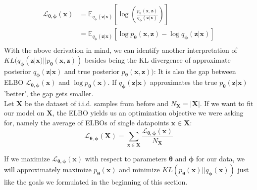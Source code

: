\documentclass[12pt]{report}
\begin{document}
\begin{equation}
\begin{split}
	\mathcal{L}_{\mathbf{\theta}, \mathbf{\phi}}(\mathbf{x}) 
	& = \mathbb{E}_{q_{\mathbf{\phi}}(\mathbf{z}|\mathbf{x})}\left[ \log\left(\frac{p_{\mathbf{\theta}}(\mathbf{x}, \mathbf{z})}{q_{\mathbf{\phi}}(\mathbf{z}|\mathbf{x})}\right) \right] \\
	& = \mathbb{E}_{q_{\mathbf{\phi}}(\mathbf{z}|\mathbf{x})}\left[ \log p_{\mathbf{\theta}}(\mathbf{x}, \mathbf{z}) - \log q_{\mathbf{\phi}}(\mathbf{z}|\mathbf{x}) \right]	\\
\end{split}
\end{equation}
With the above derivation in mind, we can identify another interpretation of $KL(q_{\mathbf{\phi}}(\mathbf{z}|\mathbf{x}) || p_{\mathbf{\theta}}(\mathbf{x}, \mathbf{z}))$ besides being the KL divergence of approximate posterior $q_{\mathbf{\phi}}(\mathbf{z}|\mathbf{x})$ and true posterior $p_{\mathbf{\theta}}(\mathbf{x}, \mathbf{z}))$: It is also the gap between ELBO $\mathcal{L}_{\mathbf{\theta}, \mathbf{\phi}}(\mathbf{x})$ and $\log p_{\mathbf{\theta}}(\mathbf{x})$. If $q_{\mathbf{\phi}}(\mathbf{z}|\mathbf{x})$ approximates the true $p_{\mathbf{\theta}}(\mathbf{z}|\mathbf{x})$ 'better', the gap gets smaller. \\
Let $\mathbf{X}$ be the dataset of i.i.d. samples from before and $N_{\mathbf{X}} = |\mathbf{X}|$. If we want to fit our model on $\mathbf{X}$, the ELBO yields us an optimization objective we were asking for, namely the average of ELBOs of single datapoints $\mathbf{x} \in \mathbf{X}$:
\begin{equation}
	\mathcal{L}_{\mathbf{\theta}, \mathbf{\phi}}(\mathbf{X}) = \sum_{\mathbf{x} \in \mathbf{X}} \frac{\mathcal{L}_{\mathbf{\theta}, \mathbf{\phi}}(\mathbf{x})}{N_{\mathbf{X}}}
\end{equation}

If we maximize $\mathcal{L}_{\mathbf{\theta}, \mathbf{\phi}}(\mathbf{x})$ with respect to parameters $\pmb{\theta}$ and $\pmb{\phi}$ for our data, we will approximately maximize $p_{\mathbf{\theta}}(\mathbf{x})$ and minimize $KL(p_{\mathbf{\theta}}(\mathbf{x}) || q_{\mathbf{\phi}}(\mathbf{x}))$ just like the goals we formulated in the beginning of this section.
\end{document}
